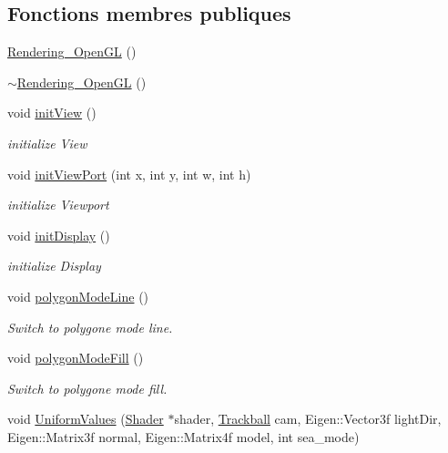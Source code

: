 \subsection*{Fonctions membres publiques}
\begin{DoxyCompactItemize}
\item 
\hyperlink{class_rendering___open_g_l_a0db708eaeae23e85a18d9c40995b27ae}{Rendering\+\_\+\+Open\+GL} ()
\item 
\hyperlink{class_rendering___open_g_l_a32ff44fc5d3a776a6add4eef3f662a96}{$\sim$\+Rendering\+\_\+\+Open\+GL} ()
\item 
void \hyperlink{class_rendering___open_g_l_aa41657730fef1c0034233a9977a31531}{init\+View} ()
\begin{DoxyCompactList}\small\item\em initialize View \end{DoxyCompactList}\item 
void \hyperlink{class_rendering___open_g_l_ac6c10061853d88c1ab6e40d6c172c69c}{init\+View\+Port} (int x, int y, int w, int h)
\begin{DoxyCompactList}\small\item\em initialize Viewport \end{DoxyCompactList}\item 
void \hyperlink{class_rendering___open_g_l_a2df315de627ccedc056c5834e65bda6d}{init\+Display} ()
\begin{DoxyCompactList}\small\item\em initialize Display \end{DoxyCompactList}\item 
void \hyperlink{class_rendering___open_g_l_a7742b4b96b3e06a021f143d17fd432df}{polygon\+Mode\+Line} ()
\begin{DoxyCompactList}\small\item\em Switch to polygone mode line. \end{DoxyCompactList}\item 
void \hyperlink{class_rendering___open_g_l_a4e3a8195e4249bf0d7c8b33400611399}{polygon\+Mode\+Fill} ()
\begin{DoxyCompactList}\small\item\em Switch to polygone mode fill. \end{DoxyCompactList}\item 
void \hyperlink{class_rendering___open_g_l_a3d370bebbf4e66ba7bd4ea61dc59bef1}{Uniform\+Values} (\hyperlink{class_shader}{Shader} $\ast$shader, \hyperlink{class_trackball}{Trackball} cam, Eigen\+::\+Vector3f light\+Dir, Eigen\+::\+Matrix3f normal, Eigen\+::\+Matrix4f model, int sea\+\_\+mode)

\end{DoxyCompactItemize}
